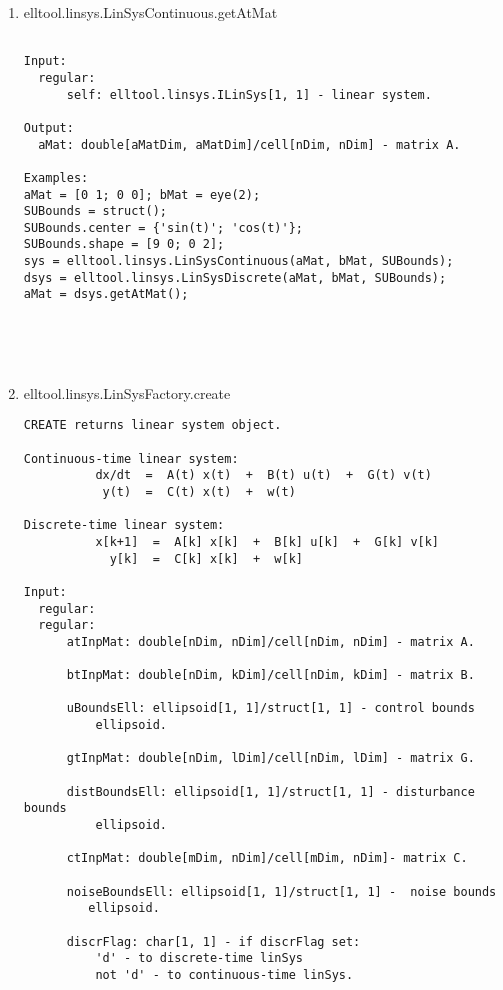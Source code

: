 \begin{enumerate}
\begin{lstlisting}
\end{lstlisting}
\fontfamily{\familydefault}
\selectfont
\item {elltool.linsys.LinSysContinuous.getAtMat}
\selectfont
\begin{lstlisting}

Input:
  regular:
      self: elltool.linsys.ILinSys[1, 1] - linear system.

Output:
  aMat: double[aMatDim, aMatDim]/cell[nDim, nDim] - matrix A.

Examples:
aMat = [0 1; 0 0]; bMat = eye(2);
SUBounds = struct();
SUBounds.center = {'sin(t)'; 'cos(t)'};
SUBounds.shape = [9 0; 0 2];
sys = elltool.linsys.LinSysContinuous(aMat, bMat, SUBounds);
dsys = elltool.linsys.LinSysDiscrete(aMat, bMat, SUBounds);
aMat = dsys.getAtMat();





\end{lstlisting}
\fontfamily{\familydefault}
\selectfont
\item {elltool.linsys.LinSysFactory.create}
\selectfont
\begin{lstlisting}
CREATE returns linear system object.

Continuous-time linear system:
          dx/dt  =  A(t) x(t)  +  B(t) u(t)  +  G(t) v(t)
           y(t)  =  C(t) x(t)  +  w(t)

Discrete-time linear system:
          x[k+1]  =  A[k] x[k]  +  B[k] u[k]  +  G[k] v[k]
            y[k]  =  C[k] x[k]  +  w[k]

Input:
  regular:
  regular:
      atInpMat: double[nDim, nDim]/cell[nDim, nDim] - matrix A.

      btInpMat: double[nDim, kDim]/cell[nDim, kDim] - matrix B.

      uBoundsEll: ellipsoid[1, 1]/struct[1, 1] - control bounds
          ellipsoid.

      gtInpMat: double[nDim, lDim]/cell[nDim, lDim] - matrix G.

      distBoundsEll: ellipsoid[1, 1]/struct[1, 1] - disturbance bounds
          ellipsoid.

      ctInpMat: double[mDim, nDim]/cell[mDim, nDim]- matrix C.

      noiseBoundsEll: ellipsoid[1, 1]/struct[1, 1] -  noise bounds
         ellipsoid.

      discrFlag: char[1, 1] - if discrFlag set:
          'd' - to discrete-time linSys
          not 'd' - to continuous-time linSys.


\end{lstlisting}
\end{enumerate}
